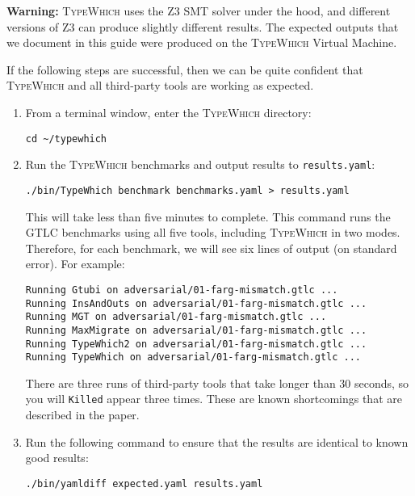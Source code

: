 \documentclass{book}
\newcommand{\system}{\textsc{TypeWhich}\xspace}
\begin{document}
\noindent
\textbf{Warning:} \system uses the Z3 SMT solver under the hood, and different
versions of Z3 can produce slightly different results. The expected outputs that
we document in this guide were produced on the \system Virtual Machine.

\medskip

\noindent
If the following steps are successful, then we can be quite confident that
\system and all third-party tools are working as expected.

\begin{enumerate}
     
\item From a terminal window, enter the \system directory:

\begin{verbatim}
cd ~/typewhich
\end{verbatim}

\item Run the \system benchmarks and output results to \texttt{results.yaml}:

\begin{verbatim}
./bin/TypeWhich benchmark benchmarks.yaml > results.yaml
\end{verbatim}

This will take less than five minutes to complete. This command runs the GTLC
benchmarks using all five tools, including \system in two modes. Therefore, for
each benchmark, we will see six lines of output (on standard error). For example:
\begin{verbatim}
Running Gtubi on adversarial/01-farg-mismatch.gtlc ...
Running InsAndOuts on adversarial/01-farg-mismatch.gtlc ...
Running MGT on adversarial/01-farg-mismatch.gtlc ...
Running MaxMigrate on adversarial/01-farg-mismatch.gtlc ...
Running TypeWhich2 on adversarial/01-farg-mismatch.gtlc ...
Running TypeWhich on adversarial/01-farg-mismatch.gtlc ...
\end{verbatim}

There are three runs of third-party tools that take longer than 30 seconds, so you will \texttt{Killed} appear
three times. These are known shortcomings that are described in the paper.

\item Run the following command to ensure that the results are identical to
known good results:

\begin{verbatim}
./bin/yamldiff expected.yaml results.yaml
\end{verbatim}


\end{enumerate}
\end{document}
